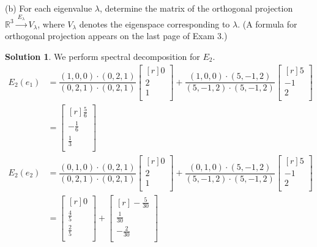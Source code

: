 \documentclass[12pt]{article}
\theoremstyle{definition}
\newtheorem*{solution}{Solution} %
\theoremstyle{plain}
\begin{document}
(b) For each eigenvalue $\lambda$, determine the matrix of the orthogonal projection
$\mathbb{R}^3\xrightarrow{\ E_\lambda\ }V_\lambda$, where $V_\lambda$ denotes the eigenspace
corresponding to $\lambda$.  (A formula for orthogonal projection appears on the last page of Exam 3.)\\
\begin{solution}
We perform spectral decomposition for $E_2$.
\begin{align*}
E_2(e_1) &= \dfrac{(1,0,0)\cdot (0,2,1)}{(0,2,1)\cdot (0,2,1)}\begin{bmatrix}[r]0\\2\\1\\\end{bmatrix} + \dfrac{(1,0,0)\cdot (5,-1,2)}{(5,-1,2)\cdot (5,-1,2)}\begin{bmatrix}[r]5\\-1\\2\\\end{bmatrix}\\
&= \begin{bmatrix}[r]\frac{5}{6}\\-\frac{1}{6}\\\frac{1}{3}\\\end{bmatrix}\\
E_2(e_2) &= \dfrac{(0,1,0)\cdot (0,2,1)}{(0,2,1)\cdot (0,2,1)}\begin{bmatrix}[r]0\\2\\1\\\end{bmatrix} + \dfrac{(0,1,0)\cdot (5,-1,2)}{(5,-1,2)\cdot (5,-1,2)}\begin{bmatrix}[r]5\\-1\\2\\\end{bmatrix}\\
&= \begin{bmatrix}[r]0\\\frac{4}{5}\\\frac{2}{5}\\\end{bmatrix} + \begin{bmatrix}[r]-\frac{5}{30}\\\frac{1}{30}\\-\frac{2}{30}\\\end{bmatrix}\\

\end{align*}
\end{solution}
\end{document}
